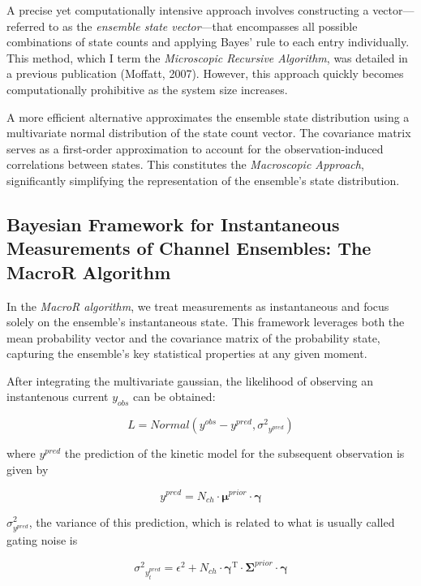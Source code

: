 \documentclass[pdflatex,sn-mathphys-num]{sn-jnl}%
\theoremstyle{thmstyleone}%
\theoremstyle{thmstyletwo}%
\theoremstyle{thmstylethree}%
\begin{document}
A precise yet computationally intensive approach involves constructing a vector—referred to as the \textit{ensemble state vector}—that encompasses all possible combinations of state counts and applying Bayes' rule to each entry individually. This method, which I term the \textit{Microscopic Recursive Algorithm}, was detailed in a previous publication (Moffatt, 2007). However, this approach quickly becomes computationally prohibitive as the system size increases.

A more efficient alternative approximates the ensemble state distribution using a multivariate normal distribution of the state count vector. The covariance matrix serves as a first-order approximation to account for the observation-induced correlations between states. This constitutes the \textit{Macroscopic Approach}, significantly simplifying the representation of the ensemble's state distribution.



\subsection{Bayesian Framework for Instantaneous Measurements of Channel Ensembles: The MacroR Algorithm}

In the \textit{MacroR algorithm}, we treat measurements as instantaneous and focus solely on the ensemble's instantaneous state. This framework leverages both the mean probability vector and the covariance matrix of the probability state, capturing the ensemble's key statistical properties at any given moment.

After integrating the multivariate gaussian, the likelihood of observing an instantenous current $y_{obs}$ can be obtained:

\begin{equation}
	L= Normal \left (y^{obs}-y^{pred}, {\sigma^2}_{y^{pred}} \right)
\end{equation}

where $y^{pred}$ the prediction of the kinetic model for the subsequent observation is given by

\begin{equation}
	y^{pred} = N_{ch} \cdot \mathbf \mu^{prior} \cdot \mathbf \gamma
\end{equation}

$\sigma^2_{y^{pred}}$, the variance of this prediction, which is related to what is usually called gating noise is 

\begin{equation}
	{\sigma^2}_{y^{pred}_{t}}
	= \epsilon^2 +N_{ch} \cdot {\mathbf \gamma}^{\mathrm{T}} \cdot \mathbf \Sigma^{prior} \cdot \mathbf \gamma
\end{equation}
\end{document}
